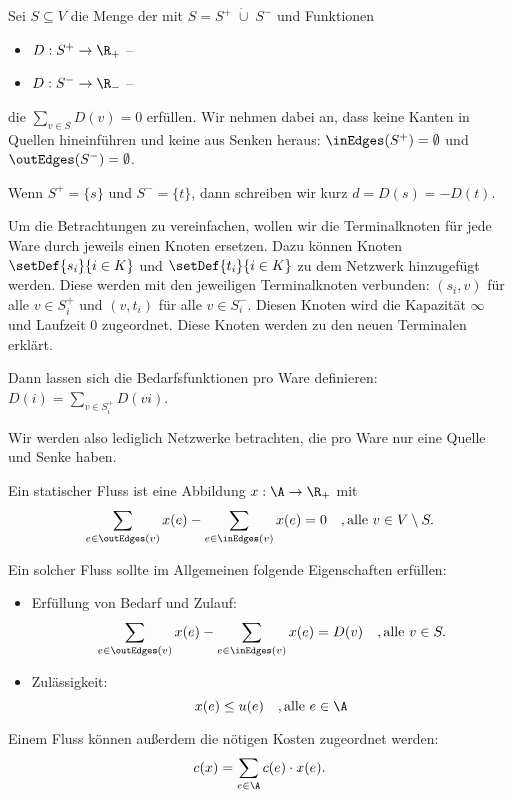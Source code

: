 \begin{definition}
    Sei $S \subseteq V$ die Menge der  mit $S = S^+ \;\dot{\cup}\; S^-$
    und Funktionen
    \begin{itemize}
        \item $D : S^+ \rightarrow \R_+$ -- 
        \item $D : S^- \rightarrow \R_-$ -- 
    \end{itemize}
    die $\sum_{v \in S} D(v) = 0$ erfüllen. Wir nehmen dabei an, dass keine Kanten in
    Quellen hineinführen und keine aus Senken heraus: $\inEdges(S^+) = \emptyset$ und
    $\outEdges(S^-) = \emptyset$.
    
    Wenn $S^+ = \{s\}$ und $S^- = \{t\}$, dann schreiben wir kurz $d = D(s) = -D(t)$.
\end{definition}

\begin{remark}
    Um die Betrachtungen zu vereinfachen, wollen wir die Terminalknoten
    für jede Ware durch jeweils einen Knoten ersetzen. Dazu können
    Knoten $\setDef{s_i}{i \in K}$ und $\setDef{t_i}{i \in K}$ zu dem
    Netzwerk hinzugefügt werden. Diese werden mit den jeweiligen
    Terminalknoten verbunden: $(s_i, v)$ für alle $v \in S_i^+$ und
    $(v,t_i)$ für alle $v \in S_i^-$. Diesen Knoten wird die Kapazität $\infty$
    und Laufzeit $0$ zugeordnet. Diese Knoten werden zu den neuen Terminalen
    erklärt.

    Dann lassen sich die Bedarfsfunktionen pro Ware definieren:
    $D(i) = \sum_{v \in S_i^+} D(vi)$.

    Wir werden also lediglich Netzwerke betrachten, die pro Ware nur eine
    Quelle und Senke haben.
\end{remark}

\begin{definition}
    Ein statischer Fluss ist eine Abbildung $x : \A \rightarrow \R_+$ mit
    \[ \sum_{e \in \outEdges(v)} x(e) - \sum_{e \in \inEdges(v)} x(e) = 0
        \quad, \text{alle } v \in V \setminus S. \]

    Ein solcher Fluss sollte im Allgemeinen folgende Eigenschaften erfüllen:
    \begin{itemize}
        \item Erfüllung von Bedarf und Zulauf:
            \[ \sum_{e \in \outEdges(v)} x(e) - \sum_{e \in \inEdges(v)} x(e) = D(v)
                \quad, \text{alle } v \in S. \]
        \item Zulässigkeit:
            \[ x(e) \leq u(e) \quad, \text{alle } e \in \A \]
    \end{itemize}

    Einem Fluss können außerdem die nötigen Kosten zugeordnet werden:
        \[ c(x) = \sum_{e \in \A} c(e) \cdot x(e). \]
\end{definition}

